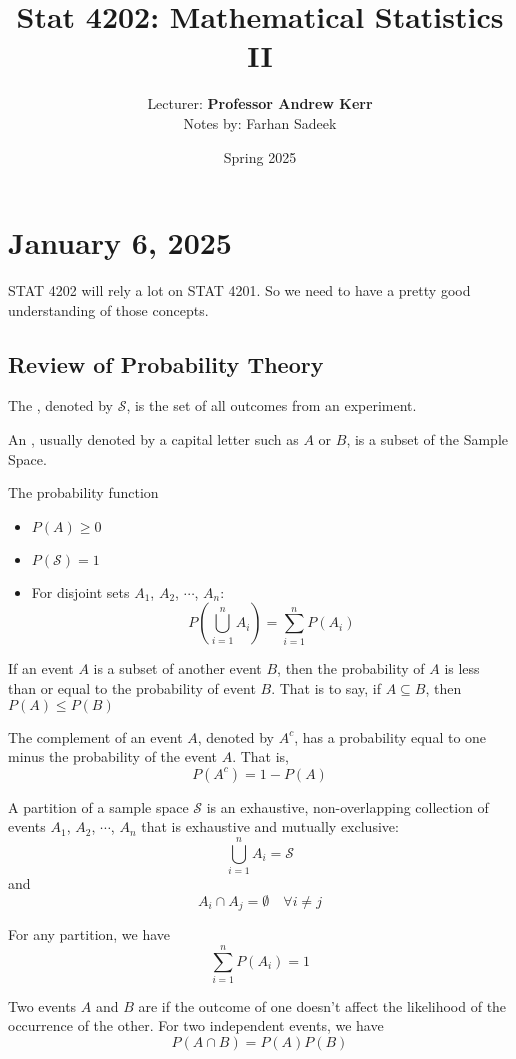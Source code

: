 \documentclass[11pt]{article}
\title{Stat 4202: Mathematical Statistics II}
\author{Lecturer: \textbf{Professor Andrew Kerr}\\Notes by: Farhan Sadeek}
\date{Spring 2025}
\begin{document}
\maketitle
\section{January 6, 2025}
STAT 4202 will rely a lot on STAT 4201. So we need to have a pretty good
understanding of those concepts.

\subsection{Review of Probability Theory}
\begin{definition}
    The , denoted by $\mathcal{S}$, is the set of all outcomes from an experiment.
\end{definition}

\begin{definition}
    An , usually denoted by a capital letter such as $A$ or $B$, is a subset of the Sample Space.
\end{definition}

The probability function
\begin{itemize}
    \item $P(A) \geq 0$
    \item $P(\mathcal{S}) = 1$
    \item For disjoint sets $A_1$, $A_2$, $\cdots$, $A_n$: \[ P\left(\bigcup_{i = 1}^{n}A_i \right) = \sum_{i = 1}^{n} P(A_i)\]
\end{itemize}

If an event $A$ is a subset of another event $B$, then the probability of $A$ is less than or equal to the probability of event $B$. That is to say, if $A \subseteq B$, then \( P(A) \leq P(B)\)

The complement of an event $A$, denoted by $A^c$, has a probability equal to one minus the probability of the event $A$. That is,
\[ P(A^c) = 1 - P(A) \]

A partition of a sample space $\mathcal{S}$ is an exhaustive, non-overlapping
collection of events $A_1$, $A_2$, $\cdots$, $A_n$ that is exhaustive and
mutually exclusive: \[\bigcup_{i=1}^{n} A_i = \mathcal{S}\] and \[A_i \cap A_j = \emptyset \quad \forall i \neq j\]

For any partition, we have \[\sum_{i=1}^{n} P(A_i) = 1\]

Two events $A$ and $B$ are  if the outcome of one doesn't
affect the likelihood of the occurrence of the other. For two independent
events, we have \[P(A \cap B) = P(A)P(B)\]
\end{document}

